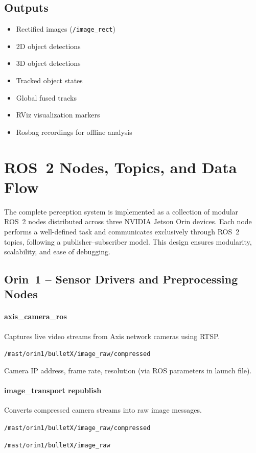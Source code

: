 \documentclass[12pt,a4paper]{report}
\begin{document}
\subsection{Outputs}
\begin{itemize}
    \item Rectified images (\texttt{/image\_rect})
    \item 2D object detections
    \item 3D object detections
    \item Tracked object states
    \item Global fused tracks
    \item RViz visualization markers
    \item Rosbag recordings for offline analysis
\end{itemize}



\section{ROS~2 Nodes, Topics, and Data Flow}
The complete perception system is implemented as a collection of modular ROS~2 nodes distributed across three NVIDIA Jetson Orin devices. Each node performs a well-defined task and communicates exclusively through ROS~2 topics, following a publisher--subscriber model. This design ensures modularity, scalability, and ease of debugging.

\subsection{Orin~1 -- Sensor Drivers and Preprocessing Nodes}

\paragraph{axis\_camera\_ros}
\begin{description}[leftmargin=1.3cm,style=nextline]
    \item[Function] Captures live video streams from Axis network cameras using RTSP.
    \item[Publishes] \texttt{/mast/orin1/bulletX/image\_raw/compressed}
    \item[Key parameters] Camera IP address, frame rate, resolution (via ROS parameters in launch file).
\end{description}

\paragraph{image\_transport republish}
\begin{description}[leftmargin=1.3cm,style=nextline]
    \item[Function] Converts compressed camera streams into raw image messages.
    \item[Subscribes] \texttt{/mast/orin1/bulletX/image\_raw/compressed}
    \item[Publishes] \texttt{/mast/orin1/bulletX/image\_raw}
\end{description}
\end{document}
